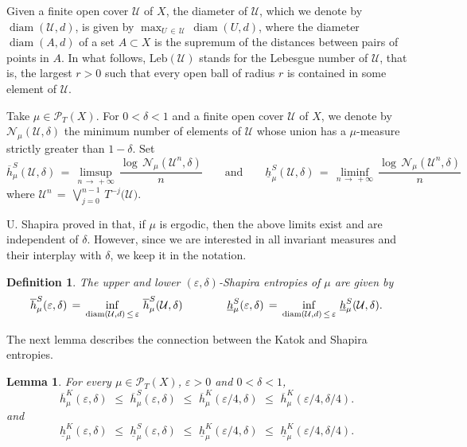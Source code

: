 \documentclass[11pt,a4paper,reqno]{amsart}
\theoremstyle{plain}
\newtheorem{lemma}[theorem]{Lemma}
\theoremstyle{definition}
\newtheorem{definition}[theorem]{Definition}
\newcommand{\ep} {\varepsilon}
\newcommand{\vep}{\varepsilon}
\newcommand{\cP}{{\mathcal P}}
\newcommand{\cU}{{\mathcal U}}
\newcommand{\diam}{\operatorname{{diam}}}
\begin{document}
Given a finite open cover $\cU$ of $X$, the diameter of $\cU$, which we denote by $\diam(\cU,d)$, is given by  $\max_{U\,\in\,\cU}\,\diam(U,d)$, where the diameter $\diam(A,d)$ of a set $A \subset X$ is the supremum of the distances between pairs of points in $A$. In what follows, $\mathrm{Leb}(\cU)$ stands for the Lebesgue number of $\cU$, that is, the largest $r>0$ such that every open ball of radius $r$ is contained in some element of $\cU$.

\smallskip

Take $\mu \in \cP_T(X)$. For $0 < \delta < 1$ and a finite open cover $\cU$ of $X$, we denote by $\mathcal{N}_\mu(\cU, \delta)$ the minimum number of elements of $\cU$ whose union has a $\mu$-measure strictly greater than $1 - \delta$. Set $$\overline{h}^S_\mu(\cU,\delta)\,=\, \limsup_{n \, \to \, +\infty}\, \frac{\log \, \mathcal{N}_\mu(\cU^n, \delta)}{n}\qquad\text{and}\qquad \underline{h}^S_\mu(\cU,\delta)\,=\, \liminf_{n \, \to \, +\infty}\, \frac{\log \, \mathcal{N}_\mu(\cU^n, \delta)}{n}$$ 
where $\cU^n\,=\,\bigvee_{j=0}^{n-1}\,T^{-j}\big(\cU\big)$. 
\smallskip

U. Shapira proved in \cite{Shapira} that, if $\mu$ is ergodic, then the above limits exist and are independent of $\delta$. However, since we are interested in all invariant measures and their interplay with $\delta$, we keep it in the notation. 

\begin{definition}\label{def:Shapira}
\emph{The \emph{upper} and \emph{lower $(\ep,\delta)$-Shapira entropies of $\mu$} are given by}
\begin{equation}\label{eq:ShapiraEntropy}
\overline{h}_\mu^S(\vep, \delta) \, = \, \inf_{\diam(\cU,d)\,\leq\,\ep}\, \overline{h}^S_\mu(\cU,\delta)\qquad\text\qquad \underline{h}_\mu^S(\vep, \delta) \, = \, \inf_{\diam(\cU,d)\,\leq\,\ep}\, \underline{h}^S_\mu(\cU,\delta).
\end{equation}
\end{definition}

The next lemma describes the connection between the Katok and Shapira entropies.

\begin{lemma} \label{K=S}
For every $\mu\in\cP_T(X)$, $\ep>0$ and $0 < \delta < 1$, 
    $$\overline{h}_\mu^K(\vep, \delta)\,\,\leq\,\,\overline{h}_\mu^S(\vep, \delta)\,\,\leq\,\,\overline{h}_\mu^K(\vep/4, \delta)\,\,\leq\,\,\overline{h}_\mu^K(\ep/4,\delta/4).$$ and $$\underline{h}_\mu^K(\vep, \delta)\,\,\leq\,\,\underline{h}_\mu^S(\vep, \delta)\,\,\leq\,\,\underline{h}_\mu^K(\vep/4, \delta)\,\,\leq\,\,\underline{h}_\mu^K(\ep/4,\delta/4).$$
\end{lemma}
\end{document}
